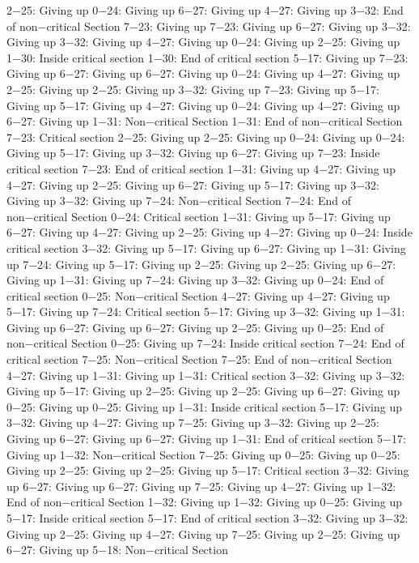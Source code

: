 2−25: Giving up
0−24: Giving up
6−27: Giving up
4−27: Giving up
3−32: End of non−critical Section
7−23: Giving up
7−23: Giving up
6−27: Giving up
3−32: Giving up
3−32: Giving up
4−27: Giving up
0−24: Giving up
2−25: Giving up
1−30: Inside critical section
1−30: End of critical section
5−17: Giving up
7−23: Giving up
6−27: Giving up
6−27: Giving up
0−24: Giving up
4−27: Giving up
2−25: Giving up
2−25: Giving up
3−32: Giving up
7−23: Giving up
5−17: Giving up
5−17: Giving up
4−27: Giving up
0−24: Giving up
4−27: Giving up
6−27: Giving up
1−31: Non−critical Section
1−31: End of non−critical Section
7−23: Critical section
2−25: Giving up
2−25: Giving up
0−24: Giving up
0−24: Giving up
5−17: Giving up
3−32: Giving up
6−27: Giving up
7−23: Inside critical section
7−23: End of critical section
1−31: Giving up
4−27: Giving up
4−27: Giving up
2−25: Giving up
6−27: Giving up
5−17: Giving up
3−32: Giving up
3−32: Giving up
7−24: Non−critical Section
7−24: End of non−critical Section
0−24: Critical section
1−31: Giving up
5−17: Giving up
6−27: Giving up
4−27: Giving up
2−25: Giving up
4−27: Giving up
0−24: Inside critical section
3−32: Giving up
5−17: Giving up
6−27: Giving up
1−31: Giving up
7−24: Giving up
5−17: Giving up
2−25: Giving up
2−25: Giving up
6−27: Giving up
1−31: Giving up
7−24: Giving up
3−32: Giving up
0−24: End of critical section
0−25: Non−critical Section
4−27: Giving up
4−27: Giving up
5−17: Giving up
7−24: Critical section
5−17: Giving up
3−32: Giving up
1−31: Giving up
6−27: Giving up
6−27: Giving up
2−25: Giving up
0−25: End of non−critical Section
0−25: Giving up
7−24: Inside critical section
7−24: End of critical section
7−25: Non−critical Section
7−25: End of non−critical Section
4−27: Giving up
1−31: Giving up
1−31: Critical section
3−32: Giving up
3−32: Giving up
5−17: Giving up
2−25: Giving up
2−25: Giving up
6−27: Giving up
0−25: Giving up
0−25: Giving up
1−31: Inside critical section
5−17: Giving up
3−32: Giving up
4−27: Giving up
7−25: Giving up
3−32: Giving up
2−25: Giving up
6−27: Giving up
6−27: Giving up
1−31: End of critical section
5−17: Giving up
1−32: Non−critical Section
7−25: Giving up
0−25: Giving up
0−25: Giving up
2−25: Giving up
2−25: Giving up
5−17: Critical section
3−32: Giving up
6−27: Giving up
6−27: Giving up
7−25: Giving up
4−27: Giving up
1−32: End of non−critical Section
1−32: Giving up
1−32: Giving up
0−25: Giving up
5−17: Inside critical section
5−17: End of critical section
3−32: Giving up
3−32: Giving up
2−25: Giving up
4−27: Giving up
7−25: Giving up
2−25: Giving up
6−27: Giving up
5−18: Non−critical Section
